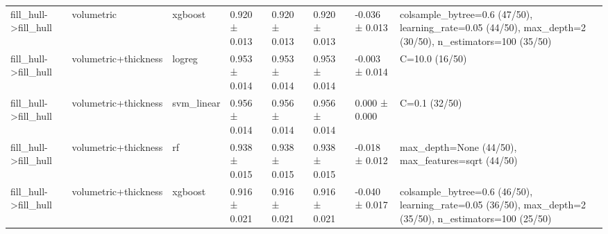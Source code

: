 \begin{tabular}{llllllll}
fill\_hull->fill\_hull & volumetric & xgboost & 0.920 ± 0.013 & 0.920 ± 0.013 & 0.920 ± 0.013 & -0.036 ± 0.013 & colsample\_bytree=0.6 (47/50), learning\_rate=0.05 (44/50), max\_depth=2 (30/50), n\_estimators=100 (35/50) \\
fill\_hull->fill\_hull & volumetric+thickness & logreg & 0.953 ± 0.014 & 0.953 ± 0.014 & 0.953 ± 0.014 & -0.003 ± 0.014 & C=10.0 (16/50) \\
fill\_hull->fill\_hull & volumetric+thickness & svm\_linear & 0.956 ± 0.014 & 0.956 ± 0.014 & 0.956 ± 0.014 & 0.000 ± 0.000 & C=0.1 (32/50) \\
fill\_hull->fill\_hull & volumetric+thickness & rf & 0.938 ± 0.015 & 0.938 ± 0.015 & 0.938 ± 0.015 & -0.018 ± 0.012 & max\_depth=None (44/50), max\_features=sqrt (44/50) \\
fill\_hull->fill\_hull & volumetric+thickness & xgboost & 0.916 ± 0.021 & 0.916 ± 0.021 & 0.916 ± 0.021 & -0.040 ± 0.017 & colsample\_bytree=0.6 (46/50), learning\_rate=0.05 (36/50), max\_depth=2 (35/50), n\_estimators=100 (25/50) \\
\bottomrule
\end{tabular}
